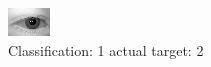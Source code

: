 \begin{figure}[h!]
\begin{center}
\includegraphics[width=0.60\columnwidth]{figures/ID401_class_1_target_2.png}
\end{center}
\caption{ Classification: 1 actual target: 2}
\label{fig:ID401_class_1_target_2}
\end{figure}
